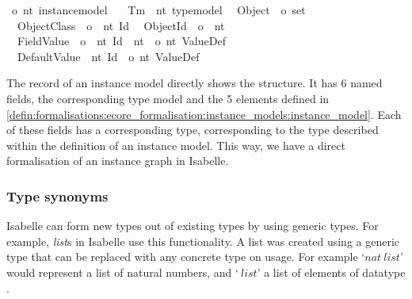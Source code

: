 \vspace{1em}\begin{isabellebody}
\isamarkupfalse%
\ {\isacharparenleft}{\isacharprime}o{\isacharcomma}\ {\isacharprime}nt{\isacharparenright}\ instance{\isacharunderscore}model\ {\isacharequal}\isanewline
\ \ Tm\ {\isacharcolon}{\isacharcolon}\ {\isachardoublequoteopen}{\isacharparenleft}{\isacharprime}nt{\isacharparenright}\ type{\isacharunderscore}model{\isachardoublequoteclose}\isanewline
\ \ Object\ {\isacharcolon}{\isacharcolon}\ {\isachardoublequoteopen}{\isacharprime}o\ set{\isachardoublequoteclose}\isanewline
\ \ ObjectClass\ {\isacharcolon}{\isacharcolon}\ {\isachardoublequoteopen}{\isacharprime}o\ {\isasymRightarrow}\ {\isacharprime}nt\ Id{\isachardoublequoteclose}\isanewline
\ \ ObjectId\ {\isacharcolon}{\isacharcolon}\ {\isachardoublequoteopen}{\isacharprime}o\ {\isasymRightarrow}\ {\isacharprime}nt{\isachardoublequoteclose}\isanewline
\ \ FieldValue\ {\isacharcolon}{\isacharcolon}\ {\isachardoublequoteopen}{\isacharparenleft}{\isacharprime}o\ {\isasymtimes}\ {\isacharparenleft}{\isacharprime}nt\ Id\ {\isasymtimes}\ {\isacharprime}nt{\isacharparenright}{\isacharparenright}\ {\isasymRightarrow}\ {\isacharparenleft}{\isacharprime}o{\isacharcomma}\ {\isacharprime}nt{\isacharparenright}\ ValueDef{\isachardoublequoteclose}\isanewline
\ \ DefaultValue\ {\isacharcolon}{\isacharcolon}\ {\isachardoublequoteopen}{\isacharprime}nt\ Id\ {\isasymRightarrow}\ {\isacharparenleft}{\isacharprime}o{\isacharcomma}\ {\isacharprime}nt{\isacharparenright}\ ValueDef{\isachardoublequoteclose}%
\end{isabellebody}

The record of an instance model directly shows the structure. It has 6 named fields, the corresponding type model and the 5 elements defined in \cref{defin:formalisations:ecore_formalisation:instance_models:instance_model}. Each of these fields has a corresponding type, corresponding to the type described within the definition of an instance model. This way, we have a direct formalisation of an instance graph in Isabelle.

\subsubsection{Type synonyms}
Isabelle can form new types out of existing types by using generic types. For example, \textit{list}s in Isabelle use this functionality. A list was created using a generic type that can be replaced with any concrete type on usage. For example `$nat\ list$' would represent a list of natural numbers, and `\isasymM$\ list$' a list of elements of datatype \isasymM.

